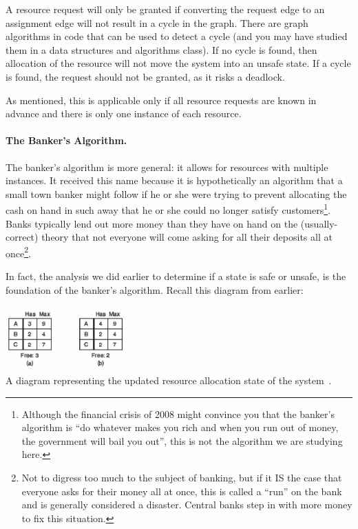 A resource request will only be granted if converting the request edge to an assignment edge will not result in a cycle in the graph. There are graph algorithms in code that can be used to detect a cycle (and you may have studied them in a data structures and algorithms class). If no cycle is found, then allocation of the resource will not move the system into an unsafe state. If a cycle is found, the request should not be granted, as it risks a deadlock.

As mentioned, this is applicable only if all resource requests are known in advance and there is only one instance of each resource.

\paragraph{The Banker's Algorithm.} The banker's algorithm is more general: it allows for resources with multiple instances. It received this name because it is hypothetically an algorithm that a small town banker might follow if he or she were trying to prevent allocating the cash on hand in such away that he or she could no longer satisfy customers\footnote{Although the financial crisis of 2008 might convince you that the banker's algorithm is ``do whatever makes you rich and when you run out of money, the government will bail you out'', this is not the algorithm we are studying here.}. Banks typically lend out more money than they have on hand on the (usually-correct) theory that not everyone will come asking for all their deposits all at once\footnote{Not to digress too much to the subject of banking, but if it IS the case that everyone asks for their money all at once, this is called a ``run'' on the bank and is generally considered a disaster. Central banks step in with more money to fix this situation.}.

In fact, the analysis we did earlier to determine if a state is safe or unsafe, is the foundation of the banker's algorithm. Recall this diagram from earlier:

\begin{center}
\includegraphics[width=0.35\textwidth]{images/unsafe-state-initial.png}\\
A diagram representing the updated resource allocation state of the system~\cite{mos}.
\end{center}

